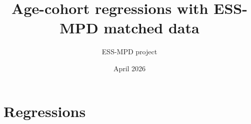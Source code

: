 \documentclass[10pt, aspectratio=169, xcolor={dvipsnames,svgnames,table}]{beamer}
\title[Some age-cohort regressions]{Age-cohort regressions with ESS-MPD matched data}
\author[ESS-MPD project]{ESS-MPD project}
\date{\normalsize \vspace{0.2cm} April 2026}
\begin{document}
\maketitle

%
%
%
%
%


\section{Regressions}
\end{document}
